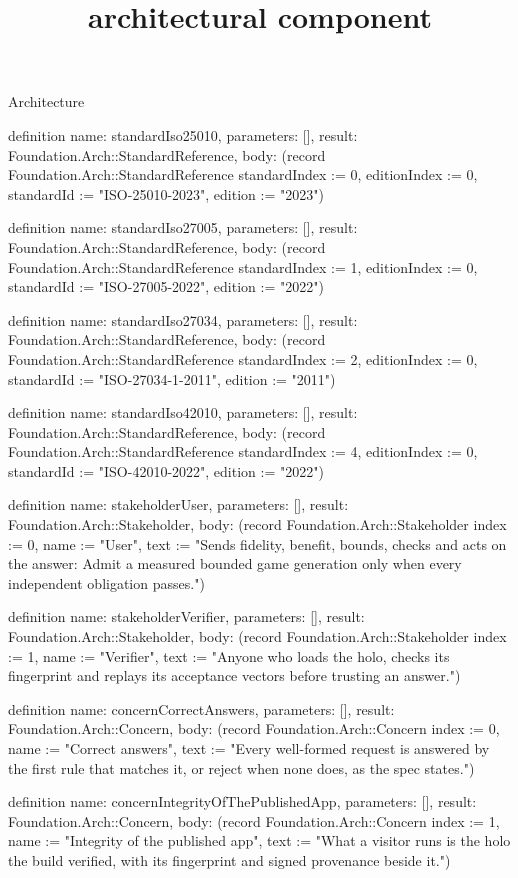 \begin{lexlean}{Architecture}
\title{architectural component}
\begin{semanticmodule}
definition{
  name: standardIso25010,
  parameters: [],
  result: Foundation.Arch::StandardReference,
  body: (record Foundation.Arch::StandardReference {standardIndex := 0, editionIndex := 0, standardId := "ISO-25010-2023", edition := "2023"})
}

definition{
  name: standardIso27005,
  parameters: [],
  result: Foundation.Arch::StandardReference,
  body: (record Foundation.Arch::StandardReference {standardIndex := 1, editionIndex := 0, standardId := "ISO-27005-2022", edition := "2022"})
}

definition{
  name: standardIso27034,
  parameters: [],
  result: Foundation.Arch::StandardReference,
  body: (record Foundation.Arch::StandardReference {standardIndex := 2, editionIndex := 0, standardId := "ISO-27034-1-2011", edition := "2011"})
}

definition{
  name: standardIso42010,
  parameters: [],
  result: Foundation.Arch::StandardReference,
  body: (record Foundation.Arch::StandardReference {standardIndex := 4, editionIndex := 0, standardId := "ISO-42010-2022", edition := "2022"})
}

definition{
  name: stakeholderUser,
  parameters: [],
  result: Foundation.Arch::Stakeholder,
  body: (record Foundation.Arch::Stakeholder {index := 0, name := "User", text := "Sends fidelity, benefit, bounds, checks and acts on the answer: Admit a measured bounded game generation only when every independent obligation passes."})
}

definition{
  name: stakeholderVerifier,
  parameters: [],
  result: Foundation.Arch::Stakeholder,
  body: (record Foundation.Arch::Stakeholder {index := 1, name := "Verifier", text := "Anyone who loads the holo, checks its fingerprint and replays its acceptance vectors before trusting an answer."})
}

definition{
  name: concernCorrectAnswers,
  parameters: [],
  result: Foundation.Arch::Concern,
  body: (record Foundation.Arch::Concern {index := 0, name := "Correct answers", text := "Every well-formed request is answered by the first rule that matches it, or reject when none does, as the spec states."})
}

definition{
  name: concernIntegrityOfThePublishedApp,
  parameters: [],
  result: Foundation.Arch::Concern,
  body: (record Foundation.Arch::Concern {index := 1, name := "Integrity of the published app", text := "What a visitor runs is the holo the build verified, with its fingerprint and signed provenance beside it."})
}


\end{semanticmodule}
\end{lexlean}
